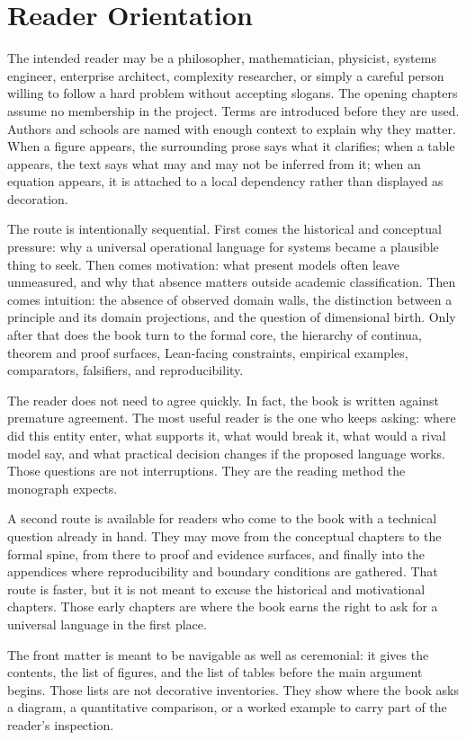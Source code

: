 \documentclass[11pt,a4paper,openany]{book}
\begin{document}
\section*{Reader Orientation}
The intended reader may be a philosopher, mathematician, physicist, systems engineer, enterprise architect, complexity researcher, or simply a careful person willing to follow a hard problem without accepting slogans. The opening chapters assume no membership in the project. Terms are introduced before they are used. Authors and schools are named with enough context to explain why they matter. When a figure appears, the surrounding prose says what it clarifies; when a table appears, the text says what may and may not be inferred from it; when an equation appears, it is attached to a local dependency rather than displayed as decoration.\par
The route is intentionally sequential. First comes the historical and conceptual pressure: why a universal operational language for systems became a plausible thing to seek. Then comes motivation: what present models often leave unmeasured, and why that absence matters outside academic classification. Then comes intuition: the absence of observed domain walls, the distinction between a principle and its domain projections, and the question of dimensional birth. Only after that does the book turn to the formal core, the hierarchy of continua, theorem and proof surfaces, Lean-facing constraints, empirical examples, comparators, falsifiers, and reproducibility.\par
The reader does not need to agree quickly. In fact, the book is written against premature agreement. The most useful reader is the one who keeps asking: where did this entity enter, what supports it, what would break it, what would a rival model say, and what practical decision changes if the proposed language works. Those questions are not interruptions. They are the reading method the monograph expects.\par
A second route is available for readers who come to the book with a technical question already in hand. They may move from the conceptual chapters to the formal spine, from there to proof and evidence surfaces, and finally into the appendices where reproducibility and boundary conditions are gathered. That route is faster, but it is not meant to excuse the historical and motivational chapters. Those early chapters are where the book earns the right to ask for a universal language in the first place.\par
The front matter is meant to be navigable as well as ceremonial: it gives the contents, the list of figures, and the list of tables before the main argument begins. Those lists are not decorative inventories. They show where the book asks a diagram, a quantitative comparison, or a worked example to carry part of the reader's inspection.\par
\end{document}
